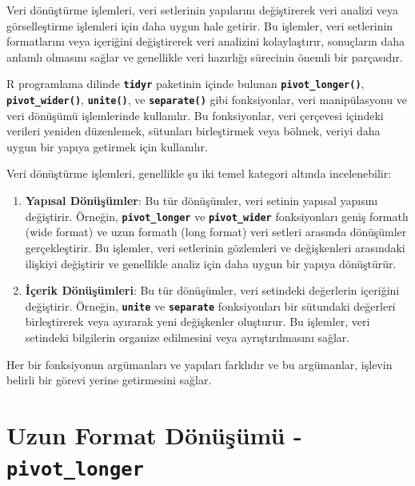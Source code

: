 \documentclass[
  letterpaper,
  DIV=11,
  numbers=noendperiod]{scrreprt}
\begin{document}
Veri dönüştürme işlemleri, veri setlerinin yapılarını değiştirerek veri
analizi veya görselleştirme işlemleri için daha uygun hale getirir. Bu
işlemler, veri setlerinin formatlarını veya içeriğini değiştirerek veri
analizini kolaylaştırır, sonuçların daha anlamlı olmasını sağlar ve
genellikle veri hazırlığı sürecinin önemli bir parçasıdır.

R programlama dilinde \textbf{\texttt{tidyr}} paketinin içinde bulunan
\textbf{\texttt{pivot\_longer()}}, \textbf{\texttt{pivot\_wider()}},
\textbf{\texttt{unite()}}, ve \textbf{\texttt{separate()}} gibi
fonksiyonlar, veri manipülasyonu ve veri dönüşümü işlemlerinde
kullanılır. Bu fonksiyonlar, veri çerçevesi içindeki verileri yeniden
düzenlemek, sütunları birleştirmek veya bölmek, veriyi daha uygun bir
yapıya getirmek için kullanılır.

Veri dönüştürme işlemleri, genellikle şu iki temel kategori altında
incelenebilir:

\begin{enumerate}
\def\labelenumi{\arabic{enumi}.}
\item
  \textbf{Yapısal Dönüşümler}: Bu tür dönüşümler, veri setinin yapısal
  yapısını değiştirir. Örneğin, \textbf{\texttt{pivot\_longer}} ve
  \textbf{\texttt{pivot\_wider}} fonksiyonları geniş formatlı (wide
  format) ve uzun formatlı (long format) veri setleri arasında
  dönüşümler gerçekleştirir. Bu işlemler, veri setlerinin gözlemleri ve
  değişkenleri arasındaki ilişkiyi değiştirir ve genellikle analiz için
  daha uygun bir yapıya dönüştürür.
\item
  \textbf{İçerik Dönüşümleri}: Bu tür dönüşümler, veri setindeki
  değerlerin içeriğini değiştirir. Örneğin, \textbf{\texttt{unite}} ve
  \textbf{\texttt{separate}} fonksiyonları bir sütundaki değerleri
  birleştirerek veya ayırarak yeni değişkenler oluşturur. Bu işlemler,
  veri setindeki bilgilerin organize edilmesini veya ayrıştırılmasını
  sağlar.
\end{enumerate}

Her bir fonksiyonun argümanları ve yapıları farklıdır ve bu argümanlar,
işlevin belirli bir görevi yerine getirmesini sağlar.

\section*{\texorpdfstring{Uzun Format Dönüşümü -
\texttt{pivot\_longer}}{Uzun Format Dönüşümü - pivot\_longer}}\label{uzun-format-duxf6nuxfcux15fuxfcmuxfc---pivot_longer}
\end{document}
